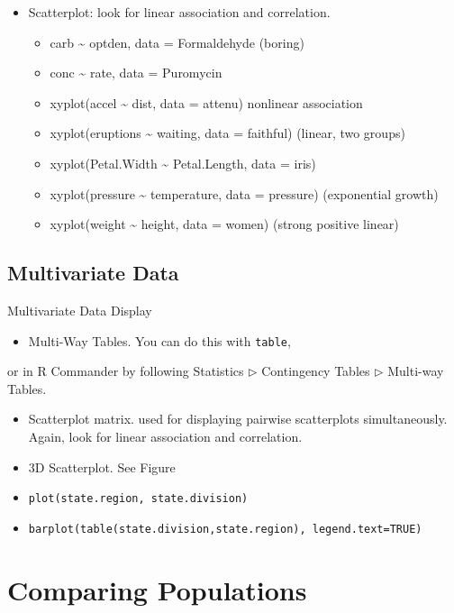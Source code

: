 \documentclass[captions=tableheading]{scrbook}
\begin{document}
\begin{itemize}
\item Scatterplot: look for linear association and correlation.
\begin{itemize}
\item carb \~{} optden, data = Formaldehyde (boring)
\item conc \~{} rate, data = Puromycin
\item xyplot(accel \~{} dist, data = attenu) nonlinear association
\item xyplot(eruptions \~{} waiting, data = faithful) (linear, two groups)
\item xyplot(Petal.Width \~{} Petal.Length, data = iris)
\item xyplot(pressure \~{} temperature, data = pressure) (exponential growth)
\item xyplot(weight \~{} height, data = women) (strong positive linear)
\end{itemize}
\end{itemize}
\subsection{Multivariate Data}
\label{sec-3-5-2}

\label{sub:Multivariate-Data}

Multivariate Data Display

\begin{itemize}
\item Multi-Way Tables. You can do this with \texttt{table},
\end{itemize}
or in \textsf{R} Commander by following \textsf{Statistics} \textsf{\(\triangleright\)} \textsf{Contingency Tables} \textsf{\(\triangleright\)} \textsf{Multi-way Tables}.
\begin{itemize}
\item Scatterplot matrix. used for displaying pairwise scatterplots simultaneously. Again, look for linear association and correlation.
\item 3D Scatterplot. See Figure \pageref{fig:3D-scatterplot-trees}
\item \texttt{plot(state.region, state.division)}
\item \texttt{barplot(table(state.division,state.region), legend.text=TRUE)}
\end{itemize}
\section{Comparing Populations}
\label{sec-3-6}
\end{document}
